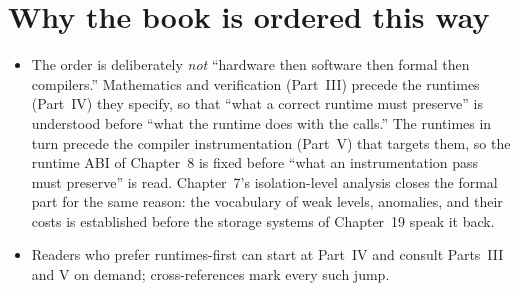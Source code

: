 \section*{Why the book is ordered this way}
\begin{itemize}
    \item The order is deliberately \emph{not} ``hardware then software then
          formal then compilers.'' Mathematics and verification (Part~III)
          precede the runtimes (Part~IV) they specify, so that ``what a
          correct runtime must preserve'' is understood before ``what the
          runtime does with the calls.'' The runtimes in turn precede the
          compiler instrumentation (Part~V) that targets them, so the runtime
          ABI of Chapter~8 is fixed before ``what an instrumentation pass
          must preserve'' is read. Chapter~7's isolation-level analysis closes
          the formal part for the same reason: the vocabulary of weak levels,
          anomalies, and their costs is established before the storage systems
          of Chapter~19 speak it back.
    \item Readers who prefer runtimes-first can start at Part~IV and consult
          Parts~III and V on demand; cross-references mark every such jump.
\end{itemize}
